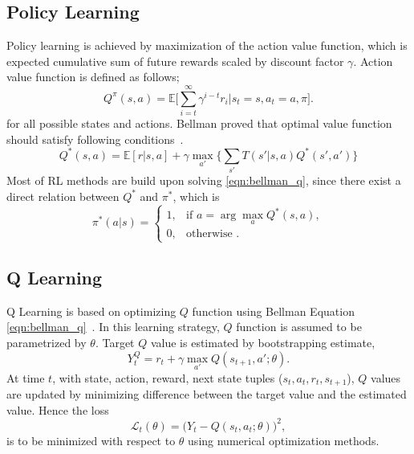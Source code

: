 \documentclass[a4paper, 12pt]{article} %
\begin{document}
\subsection{Policy Learning}

Policy learning is achieved by maximization of the action value function, which is expected cumulative sum of future rewards scaled by discount factor $\gamma$. Action value function is defined as follows;
\begin{equation}
Q^{\pi}(s,a) = \mathbb{E}\bigg[\sum_{i=t}^{\infty} \gamma^{i-t} r_i|s_t=s, a_t=a, \pi\bigg]. %
\end{equation}
for all possible states and actions. 
Bellman proved that optimal value function should satisfy following conditions~\cite{bellman_dynamic_2003}. 
\begin{equation}
\label{eqn:bellman_q}
Q^{*}(s,a) = \mathbb{E}[r|s,a] + \gamma \max_{a'} \Big\{ \sum_{s'} T(s'|s,a) Q^{*}(s',a') \Big\}
\end{equation}
Most of RL methods are build upon solving \eqref{eqn:bellman_q}, since there exist a direct relation between $Q^*$ and $\pi^*$, which is 
\begin{equation}
\label{eqn:policy_stochastic_q}
\pi^{*}(a|s) = 
\begin{cases}
1,   & \text{if  } a = \arg\max_{a} Q^{*}(s,a), \\
0,   & \text{otherwise  }.
\end{cases} 
\end{equation}

\subsection{Q Learning}
Q Learning is based on optimizing $Q$ function using Bellman Equation \eqref{eqn:bellman_q}~\cite{watkins_technical_1992}. 
In this learning strategy, $Q$ function is assumed to be parametrized by $\theta$. 
Target $Q$ value is estimated by bootstrapping estimate, 
\begin{equation}
\label{eqn:q_target}
Y_t^Q = r_t + \gamma \max_{a'} Q(s_{t+1},a';\theta).
\end{equation}
At time $t$,  with state, action, reward, next state tuples ($s_t,a_t,r_t,s_{t+1}$), 
$Q$ values are updated by minimizing difference between the target value and the estimated value. 
Hence the loss 
\begin{equation}
\label{eqn:q_loss}
\mathcal{L}_t(\theta) = \big( Y_t - Q(s_t,a_t;\theta) \big) ^ 2, 
\end{equation}
is to be minimized with respect to $\theta$ using numerical optimization methods. 
\end{document}
